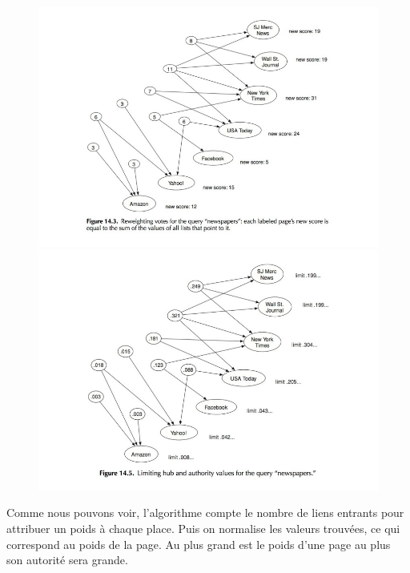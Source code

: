\begin{figure}
\centering
\includegraphics[scale=0.5]{images/ref/fig-14-3.jpeg}
\includegraphics[scale=0.5]{images/ref/fig-14-5.jpeg}
\caption{}
\end{figure}



\newpage

	
Comme nous pouvons voir, l'algorithme compte le nombre de liens entrants pour attribuer un poids à chaque place. Puis on normalise les valeurs trouvées, ce qui correspond au poids de la page.
Au plus grand est le poids d'une page au plus son autorité sera grande.\\
